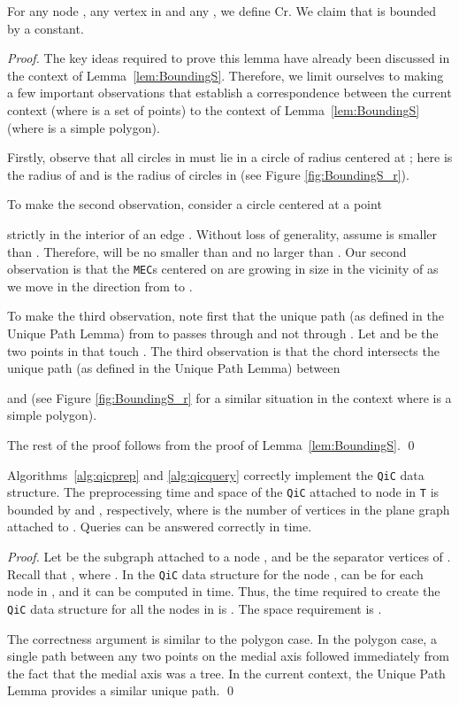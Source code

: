\documentclass[12pt]{llncs}
\begin{document}
\begin{lemma} \label{lem:BoundingS2}
For any  node , any vertex  in  and any , we define  Cr. We claim that  is
bounded by a constant. 
\end{lemma}
\begin{proof}
The key ideas required to prove this lemma have already been discussed in the 
context of 
Lemma~\ref{lem:BoundingS}. Therefore, we limit ourselves 
to making a few  important observations that establish a correspondence between the 
current context (where  is a set of points) to the context of 
Lemma~\ref{lem:BoundingS} (where  is a simple polygon). 

Firstly, observe that all circles in  must lie in a circle  of radius  
centered at ; here  is the radius of   
and  is the radius of circles in  (see Figure \ref{fig:BoundingS_r}).

To make the second observation, consider a circle  centered at a point 
 
strictly in the interior of  an edge .
Without loss of generality,  assume  is smaller than . 
Therefore,  will be no smaller  than  and 
no larger  than . Our second observation is that the {\tt MEC}s  
centered on 
 are growing in size in the vicinity of  as we move in 
the direction from  to . 

To make the third observation, note first that the unique path (as defined in the 
Unique 
Path Lemma) from  to  passes through  and not 
through . Let  and 
 be the two points in  that touch . The third observation is that  the 
chord 
 intersects the unique path (as defined in the Unique Path Lemma) between 
 
and  (see Figure
\ref{fig:BoundingS_r} for a similar situation in the context where  is a simple 
polygon).  

The rest of the proof follows from the proof of Lemma~\ref{lem:BoundingS}. \qed
\end{proof}


\begin{lemma}\label{lem:qic}
Algorithms\ \ref{alg:qicprep} and \ref{alg:qicquery} correctly implement the {\tt QiC} data structure.
The preprocessing time and space of the {\tt QiC} attached to node  in {\tt T} is bounded by  and , respectively, where  is the number of vertices in the plane graph  attached to . Queries can be answered correctly in  time.
\end{lemma}
\begin{proof}
Let  be the subgraph attached to a node , and  be the separator vertices of . Recall that , where . In the {\tt QiC} data structure 
for the node ,  can be  for each node in , 
and it can be computed in  time. Thus, the time required 
to create the {\tt QiC} data structure for all the nodes in  is 
. The space requirement is . 

The correctness argument is similar to the polygon case. In the polygon case, a single path between any two points on the medial axis followed immediately from the fact that the medial axis was a tree. In the current context, the Unique Path Lemma provides a similar unique path. 
\qed
\end{proof}
\end{document}
